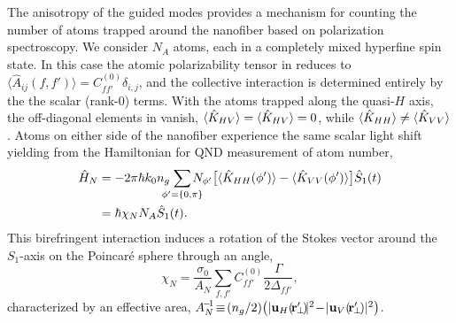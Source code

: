 \documentclass[aps,pra,twocolumn]{revtex4-1} %
\newcommand{\polcomp}{\hat{K}} %
\newcommand{\chiN}{\chi_{N}}
\newcommand{\Abir}{A_N}
\begin{document}
The anisotropy of the guided modes provides a mechanism for counting the number of atoms trapped around the nanofiber based on polarization spectroscopy.  
We consider $N_A$ atoms, each in a completely mixed {\color{blue} hyperfine spin} state. In this case the atomic polarizability tensor in  reduces to $\langle \hat{A}_{ij}(f,f') \rangle = C_{ff'}^{(0)} \delta_{i,j}$, and the collective interaction is determined entirely by the the scalar (rank-0) terms.  
With the atoms trapped along the quasi-$H$ axis, the off-diagonal elements in  vanish, $\expt{ \polcomp_{HV} } = \expt{ \polcomp_{HV} } =0$, while $\expt{ \polcomp_{HH} } \neq  \expt{ \polcomp_{VV} }$.  
Atoms on either side of the nanofiber experience the same scalar light shift yielding from   the Hamiltonian for QND measurement of atom number,
	\begin{align}
		\hat{H}_{N} &= -2\pi \hbar k_0 n_g \!\!\!\!\!\sum_{\phi' = \{0,\pi \}}\!\!\!\!\!\! N_{\phi'} \big[ \expt{ \polcomp_{HH}(\phi')}  - \expt{ \polcomp_{VV}(\phi')} \big] \hat{S}_1(t)  \nonumber \\
		& =  \hbar \chiN N_A \hat{S}_1(t).  \label{Eq::MixedHamiltonian}
	\end{align}	
This birefringent interaction induces a rotation of the Stokes vector  around the $S_1$-axis on the Poincar\'{e} sphere through an angle, 
	\begin{equation} \label{Eq::RotationAngle}
		\chiN = \frac{\sigma_0}{\Abir}  \sum_{f,f'}  C_{ff'}^{(0)} \frac{\Gamma}{2 \Delta_{ff'}},
	\end{equation}
characterized by an effective area, $\Abir^{\!-\!1} \!\equiv\! (n_g/2) \big( |\mathbf{u}_{H}(\!\br'\!\!_\perp\!)\!|^2 \!-\! |\mathbf{u}_{V}(\!\br'\!\!_\perp\!)| ^2 \big)$.   
\end{document}
